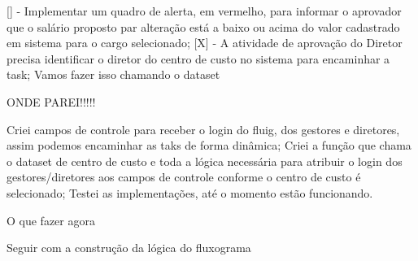 [] - Implementar um quadro de alerta, em vermelho, para informar o aprovador que o salário proposto par alteração está a baixo ou  acima do valor cadastrado em sistema para o cargo selecionado;
[X] - A atividade de aprovação do Diretor precisa identificar o diretor do centro de custo no sistema para encaminhar a task; Vamos fazer isso chamando o dataset

ONDE PAREI!!!!!

    Criei campos de controle para receber o login do fluig, dos gestores e diretores, assim podemos encaminhar as taks de forma dinâmica;
    Criei a função que chama o dataset de centro de custo e toda a lógica necessária para atribuir o login dos gestores/diretores aos campos de controle conforme o centro de custo é selecionado;
    Testei as implementações, até o momento estão funcionando.

O que fazer agora

    Seguir com a construção da lógica do fluxograma